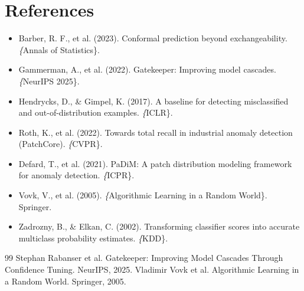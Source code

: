 \documentclass[10pt]{article}
\begin{document}
\section{References}

\begin{itemize}
\item Barber, R. F., et al. (2023). Conformal prediction beyond exchangeability. \textit\{Annals of Statistics\}.
\item Gammerman, A., et al. (2022). Gatekeeper: Improving model cascades. \textit\{NeurIPS 2025\}.
\item Hendrycks, D., \& Gimpel, K. (2017). A baseline for detecting misclassified and out-of-distribution examples. \textit\{ICLR\}.
\item Roth, K., et al. (2022). Towards total recall in industrial anomaly detection (PatchCore). \textit\{CVPR\}.
\item Defard, T., et al. (2021). PaDiM: A patch distribution modeling framework for anomaly detection. \textit\{ICPR\}.
\item Vovk, V., et al. (2005). \textit\{Algorithmic Learning in a Random World\}. Springer.
\item Zadrozny, B., \& Elkan, C. (2002). Transforming classifier scores into accurate multiclass probability estimates. \textit\{KDD\}.
\end{itemize}


\begin{thebibliography}{99}
 Stephan Rabanser et al. Gatekeeper: Improving Model Cascades Through Confidence Tuning. NeurIPS, 2025.
 Vladimir Vovk et al. Algorithmic Learning in a Random World. Springer, 2005.
\end{thebibliography}
\end{document}
